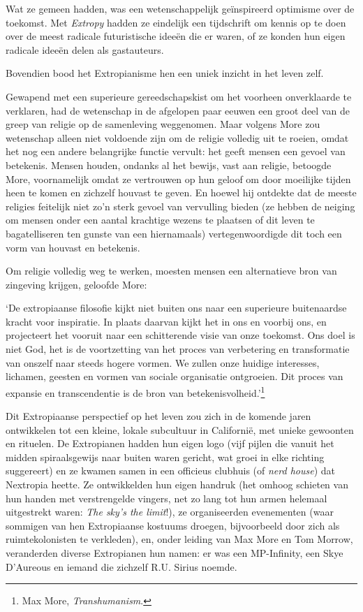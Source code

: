 \documentclass[
  a5paper,
  smalldemyvopaper,11pt,twoside,onecolumn,openright,extrafontsizes,
hidelinks]{memoir}
\renewenvironment{quote}%
               {\list{}{\rightmargin=.3cm\leftmargin=.3cm}%
                \itshape \item[]}%
               {\endlist}
\begin{document}
Wat ze gemeen hadden, was een wetenschappelijk geïnspireerd optimisme
over de toekomst. Met \emph{Extropy} hadden ze eindelijk een tijdschrift
om kennis op te doen over de meest radicale futuristische ideeën die er
waren, of ze konden hun eigen radicale ideeën delen als gastauteurs.

Bovendien bood het Extropianisme hen een uniek inzicht in het leven
zelf.

Gewapend met een superieure gereedschapskist om het voorheen
onverklaarde te verklaren, had de wetenschap in de afgelopen paar eeuwen
een groot deel van de greep van religie op de samenleving weggenomen.
Maar volgens More zou wetenschap alleen niet voldoende zijn om de
religie volledig uit te roeien, omdat het nog een andere belangrijke
functie vervult: het geeft mensen een gevoel van betekenis. Mensen
houden, ondanks al het bewijs, vast aan religie, betoogde More,
voornamelijk omdat ze vertrouwen op hun geloof om door moeilijke tijden
heen te komen en zichzelf houvast te geven. En hoewel hij ontdekte dat
de meeste religies feitelijk niet zo'n sterk gevoel van vervulling
bieden (ze hebben de neiging om mensen onder een aantal krachtige wezens
te plaatsen of dit leven te bagatelliseren ten gunste van een
hiernamaals) vertegenwoordigde dit toch een vorm van houvast en
betekenis.

Om religie volledig weg te werken, moesten mensen een alternatieve bron
van zingeving krijgen, geloofde More:

\begin{quote}
`De extropiaanse filosofie kijkt niet buiten ons naar een superieure
buitenaardse kracht voor inspiratie. In plaats daarvan kijkt het in ons
en voorbij ons, en projecteert het vooruit naar een schitterende visie
van onze toekomst. Ons doel is niet God, het is de voortzetting van het
proces van verbetering en transformatie van onszelf naar steeds hogere
vormen. We zullen onze huidige interesses, lichamen, geesten en vormen
van sociale organisatie ontgroeien. Dit proces van expansie en
transcendentie is de bron van betekenisvolheid.'\footnote{Max More,
  \emph{Transhumanism}.}
\end{quote}

Dit Extropiaanse perspectief op het leven zou zich in de komende jaren
ontwikkelen tot een kleine, lokale subcultuur in Californië, met unieke
gewoonten en rituelen. De Extropianen hadden hun eigen logo (vijf pijlen
die vanuit het midden spiraalsgewijs naar buiten waren gericht, wat
groei in elke richting suggereert) en ze kwamen samen in een officieus
clubhuis (of \emph{nerd house}) dat Nextropia heette. Ze ontwikkelden
hun eigen handruk (het omhoog schieten van hun handen met verstrengelde
vingers, net zo lang tot hun armen helemaal uitgestrekt waren: \emph{The
sky's the limit}!), ze organiseerden evenementen (waar sommigen van hen
Extropiaanse kostuums droegen, bijvoorbeeld door zich als
ruimtekolonisten te verkleden), en, onder leiding van Max More en Tom
Morrow, veranderden diverse Extropianen hun namen: er was een
MP-Infinity, een Skye D'Aureous en iemand die zichzelf R.U. Sirius
noemde.
\end{document}
